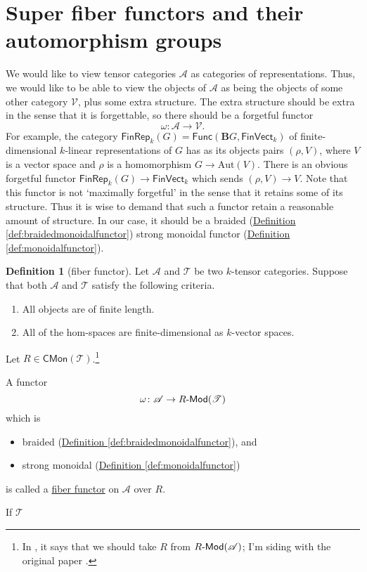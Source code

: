 \documentclass[a4paper]{report}
\newcommand{\defn}[1]{\ul{#1}}
\def\mhyp{{\hbox{-}}}
\theoremstyle{definition}
\newtheorem{definition}{Definition}[section]
\theoremstyle{plain}
\theoremstyle{remark}
\begin{document}
\section{Super fiber functors and their automorphism groups}
We would like to view tensor categories $\mathscr{A}$ as categories of representations. Thus, we would like to be able to view the objects of $\mathscr{A}$ as being the objects of some other category $\mathscr{V}$, plus some extra structure. The extra structure should be extra in the sense that it is forgettable, so there should be a forgetful functor
\begin{equation*}
  \omega\colon \mathscr{A} \rightarrow \mathscr{V}.
\end{equation*}
For example, the category $\mathsf{FinRep}_{k}(G) = \mathsf{Func}(\mathbf{B}G, \mathsf{FinVect}_{k})$ of finite-dimensional $k$-linear representations of $G$ has as its objects pairs $(\rho, V)$, where $V$ is a vector space and $\rho$ is a homomorphism $G \to \mathrm{Aut}(V)$. There is an obvious forgetful functor $\mathsf{FinRep}_{k}(G) \to \mathsf{FinVect}_{k}$ which sends $(\rho, V) \to V$. Note that this functor is not `maximally forgetful' in the sense that it retains some of its structure. Thus it is wise to demand that such a functor retain a reasonable amount of structure. In our case, it should be a braided (\hyperref[def:braidedmonoidalfunctor]{Definition \ref*{def:braidedmonoidalfunctor}}) strong monoidal functor (\hyperref[def:monoidalfunctor]{Definition \ref*{def:monoidalfunctor}}).

\begin{definition}[fiber functor]
  \label{def:fiberfunctor}
  Let $\mathscr{A}$ and $\mathscr{T}$ be two $k$-tensor categories. Suppose that both $\mathscr{A}$ and $\mathscr{T}$ satisfy the following criteria.
  \begin{enumerate}
    \item All objects are of finite length.

    \item All of the hom-spaces are finite-dimensional as $k$-vector spaces.
  \end{enumerate}

  Let $R \in \mathsf{CMon}(\mathscr{T})$.\footnote{In \cite{nlab-deligne-theorem}, it says that we should take $R$ from $R\mhyp\mathsf{Mod}(\mathscr{A})$; I'm siding with the original paper \cite{deligne-categories-tensorielle}.}

  A functor
  \begin{equation*}
    \omega\colon \mathscr{A} \to R\mhyp\mathsf{Mod}(\mathscr{T})
  \end{equation*}
  which is
  \begin{itemize}
    \item braided (\hyperref[def:braidedmonoidalfunctor]{Definition \ref*{def:braidedmonoidalfunctor}}), and

    \item strong monoidal (\hyperref[def:monoidalfunctor]{Definition \ref*{def:monoidalfunctor}})
  \end{itemize}
  is called a \defn{fiber functor} on $\mathscr{A}$ over $R$.

  If $\mathscr{T}$
\end{definition}
\end{document}
